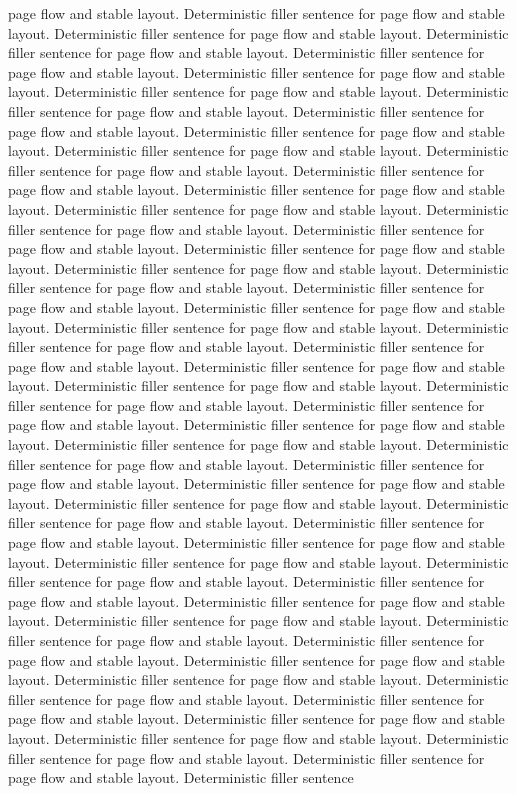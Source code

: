 \documentclass{article}
\begin{document}
page flow and stable layout. Deterministic filler sentence for page flow and stable layout. Deterministic filler sentence for page flow and stable layout. Deterministic filler sentence for page flow and stable layout. Deterministic filler sentence for page flow and stable layout. Deterministic filler sentence for page flow and stable layout. Deterministic filler sentence for page flow and stable layout. Deterministic filler sentence for page flow and stable layout. Deterministic filler sentence for page flow and stable layout. Deterministic filler sentence for page flow and stable layout. Deterministic filler sentence for page flow and stable layout. Deterministic filler sentence for page flow and stable layout. Deterministic filler sentence for page flow and stable layout. Deterministic filler sentence for page flow and stable layout. Deterministic filler sentence for page flow and stable layout. Deterministic filler sentence for page flow and stable layout. Deterministic filler sentence for page flow and stable layout. Deterministic filler sentence for page flow and stable layout. Deterministic filler sentence for page flow and stable layout. Deterministic filler sentence for page flow and stable layout. Deterministic filler sentence for page flow and stable layout. Deterministic filler sentence for page flow and stable layout. Deterministic filler sentence for page flow and stable layout. Deterministic filler sentence for page flow and stable layout. Deterministic filler sentence for page flow and stable layout. Deterministic filler sentence for page flow and stable layout. Deterministic filler sentence for page flow and stable layout. Deterministic filler sentence for page flow and stable layout. Deterministic filler sentence for page flow and stable layout. Deterministic filler sentence for page flow and stable layout. Deterministic filler sentence for page flow and stable layout. Deterministic filler sentence for page flow and stable layout. Deterministic filler sentence for page flow and stable layout. Deterministic filler sentence for page flow and stable layout. Deterministic filler sentence for page flow and stable layout. Deterministic filler sentence for page flow and stable layout. Deterministic filler sentence for page flow and stable layout. Deterministic filler sentence for page flow and stable layout. Deterministic filler sentence for page flow and stable layout. Deterministic filler sentence for page flow and stable layout. Deterministic filler sentence for page flow and stable layout. Deterministic filler sentence for page flow and stable layout. Deterministic filler sentence for page flow and stable layout. Deterministic filler sentence for page flow and stable layout. Deterministic filler sentence for page flow and stable layout. Deterministic filler sentence for page flow and stable layout. Deterministic filler sentence for page flow and stable layout. Deterministic filler sentence for page flow and stable layout. Deterministic filler sentence for page flow and stable layout. Deterministic filler sentence for page flow and stable layout. Deterministic filler sentence for page flow and stable layout. Deterministic filler sentence for page flow and stable layout. Deterministic filler sentence for page flow and stable layout. Deterministic filler sentence 
\end{document}
